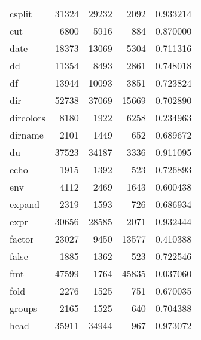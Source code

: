 \begin{longtable}{lrrrr}
csplit    &                    31324 &        29232 &          2092 &                 0.933214 \\
cut       &                     6800 &         5916 &           884 &                 0.870000 \\
date      &                    18373 &        13069 &          5304 &                 0.711316 \\
dd        &                    11354 &         8493 &          2861 &                 0.748018 \\
df        &                    13944 &        10093 &          3851 &                 0.723824 \\
dir       &                    52738 &        37069 &         15669 &                 0.702890 \\
dircolors &                     8180 &         1922 &          6258 &                 0.234963 \\
dirname   &                     2101 &         1449 &           652 &                 0.689672 \\
du        &                    37523 &        34187 &          3336 &                 0.911095 \\
echo      &                     1915 &         1392 &           523 &                 0.726893 \\
env       &                     4112 &         2469 &          1643 &                 0.600438 \\
expand    &                     2319 &         1593 &           726 &                 0.686934 \\
expr      &                    30656 &        28585 &          2071 &                 0.932444 \\
factor    &                    23027 &         9450 &         13577 &                 0.410388 \\
false     &                     1885 &         1362 &           523 &                 0.722546 \\
fmt       &                    47599 &         1764 &         45835 &                 0.037060 \\
fold      &                     2276 &         1525 &           751 &                 0.670035 \\
groups    &                     2165 &         1525 &           640 &                 0.704388 \\
head      &                    35911 &        34944 &           967 &                 0.973072 \\

\end{longtable}
